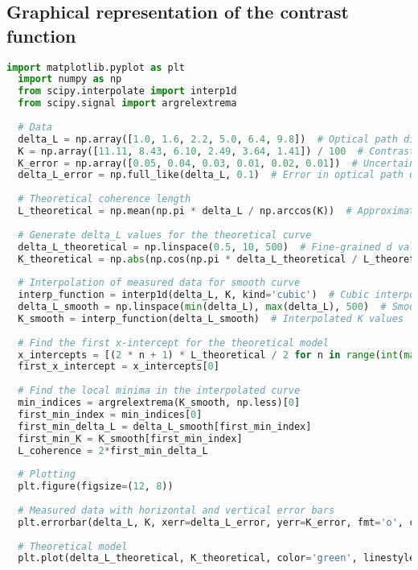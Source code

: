 \documentclass[a4paper,11pt]{article}
\begin{document}
\subsection{Graphical representation of the contrast function}
\begin{lstlisting}[language=Python]
  import matplotlib.pyplot as plt
  import numpy as np
  from scipy.interpolate import interp1d
  from scipy.signal import argrelextrema
  
  # Data
  delta_L = np.array([1.0, 1.6, 2.2, 5.0, 6.4, 9.8])  # Optical path difference (d, cm)
  K = np.array([11.11, 8.43, 6.10, 2.49, 3.64, 1.41]) / 100  # Contrast Function (K), scaled to proper range
  K_error = np.array([0.05, 0.04, 0.03, 0.01, 0.02, 0.01])  # Uncertainty of K
  delta_L_error = np.full_like(delta_L, 0.1)  # Error in optical path difference (0.1 cm)
  
  # Theoretical coherence length
  L_theoretical = np.mean(np.pi * delta_L / np.arccos(K))  # Approximate L from the given data
  
  # Generate delta_L values for the theoretical curve
  delta_L_theoretical = np.linspace(0.5, 10, 500)  # Fine-grained d values for the curve
  K_theoretical = np.abs(np.cos(np.pi * delta_L_theoretical / L_theoretical))  # Calculate theoretical K
  
  # Interpolation of measured data for smooth curve
  interp_function = interp1d(delta_L, K, kind='cubic')  # Cubic interpolation
  delta_L_smooth = np.linspace(min(delta_L), max(delta_L), 500)  # Smooth d values
  K_smooth = interp_function(delta_L_smooth)  # Interpolated K values
  
  # Find the first x-intercept for the theoretical model
  x_intercepts = [(2 * n + 1) * L_theoretical / 2 for n in range(int(max(delta_L_theoretical) / (L_theoretical / 2)))]
  first_x_intercept = x_intercepts[0]
  
  # Find the local minima in the interpolated curve
  min_indices = argrelextrema(K_smooth, np.less)[0]
  first_min_index = min_indices[0]
  first_min_delta_L = delta_L_smooth[first_min_index]
  first_min_K = K_smooth[first_min_index]
  L_coherence = 2*first_min_delta_L
  
  # Plotting
  plt.figure(figsize=(12, 8))
  
  # Measured data with horizontal and vertical error bars
  plt.errorbar(delta_L, K, xerr=delta_L_error, yerr=K_error, fmt='o', color='blue', capsize=5, label='Measured Data')
  
  # Theoretical model
  plt.plot(delta_L_theoretical, K_theoretical, color='green', linestyle='--', label=f'Theoretical Model (L = {L_theoretical:.2f} cm)')
  

\end{lstlisting}
\end{document}
